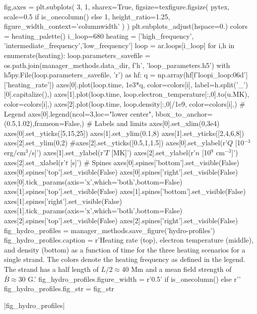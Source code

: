 \begin{pycode}
fig,axes = plt.subplots(
    3, 1, sharex=True,
    figsize=texfigure.figsize(
        pytex,
        scale=0.5 if is_onecolumn() else 1,
        height_ratio=1.25,
        figure_width_context='columnwidth'
    )
)
plt.subplots_adjust(hspace=0.)
colors = heating_palette()
i_loop=680
heating = ['high_frequency', 'intermediate_frequency','low_frequency']
loop = ar.loops[i_loop]
for i,h in enumerate(heating):
    loop.parameters_savefile = os.path.join(manager_methods.data_dir, f'{h}', 'loop_parameters.h5')
    with h5py.File(loop.parameters_savefile, 'r') as hf:
        q = np.array(hf[f'loop{i_loop:06d}']['heating_rate'])
    axes[0].plot(loop.time, 1e3*q, color=colors[i], label=h.split('_')[0].capitalize(),)
    axes[1].plot(loop.time, loop.electron_temperature[:,0].to(u.MK), color=colors[i],)
    axes[2].plot(loop.time, loop.density[:,0]/1e9, color=colors[i],)
# Legend
axes[0].legend(ncol=3,loc="lower center", bbox_to_anchor=(0.5,1.02),frameon=False,)
# Labels and limits
axes[0].set_xlim(0,3e4)
axes[0].set_yticks([5,15,25])
axes[1].set_ylim(0.1,8)
axes[1].set_yticks([2,4,6,8])
axes[2].set_ylim(0,2)
#axes[2].set_yticks([0.5,1,1.5])
axes[0].set_ylabel(r'$Q$ [10$^{-3}$ erg$/$cm$^{3}$$/$s]')
axes[1].set_ylabel(r'$T$ [MK]')
axes[2].set_ylabel(r'$n$ [10$^9$ cm$^{-3}$]')
axes[2].set_xlabel(r'$t$ [s]')
# Spines
axes[0].spines['bottom'].set_visible(False)
axes[0].spines['top'].set_visible(False)
axes[0].spines['right'].set_visible(False)
axes[0].tick_params(axis='x',which='both',bottom=False)
axes[1].spines['top'].set_visible(False)
axes[1].spines['bottom'].set_visible(False)
axes[1].spines['right'].set_visible(False)
axes[1].tick_params(axis='x',which='both',bottom=False)
axes[2].spines['top'].set_visible(False)
axes[2].spines['right'].set_visible(False)
fig_hydro_profiles = manager_methods.save_figure('hydro-profiles')
fig_hydro_profiles.caption = r'Heating rate (top), electron temperature (middle), and density (bottom) as a function of time for the three heating scenarios for a single strand. The colors denote the heating frequency as defined in the legend. The strand has a half length of $L/2\approx40$ Mm and a mean field strength of $\bar{B}\approx30$ G.'
fig_hydro_profiles.figure_width = r'0.5\columnwidth' if is_onecolumn() else r'\columnwidth'
fig_hydro_profiles.fig_str = fig_str
\end{pycode}
|fig_hydro_profiles|

